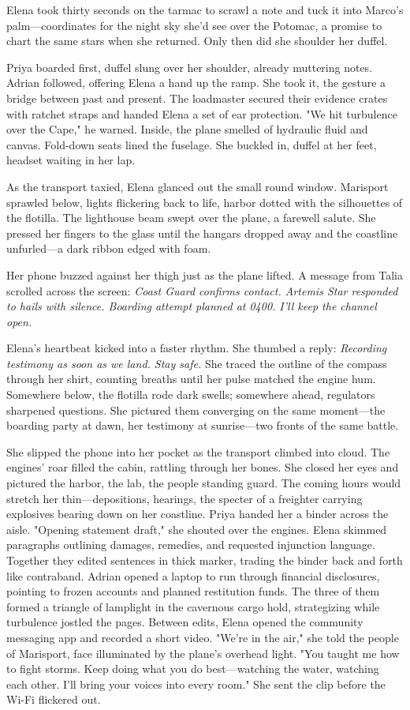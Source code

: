 Elena took thirty seconds on the tarmac to scrawl a note and tuck it into Marco's palm—coordinates for the night sky she'd see over the Potomac, a promise to chart the same stars when she returned. Only then did she shoulder her duffel.

Priya boarded first, duffel slung over her shoulder, already muttering notes. Adrian followed, offering Elena a hand up the ramp. She took it, the gesture a bridge between past and present. The loadmaster secured their evidence crates with ratchet straps and handed Elena a set of ear protection. "We hit turbulence over the Cape," he warned. Inside, the plane smelled of hydraulic fluid and canvas. Fold-down seats lined the fuselage. She buckled in, duffel at her feet, headset waiting in her lap.

As the transport taxied, Elena glanced out the small round window. Marisport sprawled below, lights flickering back to life, harbor dotted with the silhouettes of the flotilla. The lighthouse beam swept over the plane, a farewell salute. She pressed her fingers to the glass until the hangars dropped away and the coastline unfurled—a dark ribbon edged with foam.

Her phone buzzed against her thigh just as the plane lifted. A message from Talia scrolled across the screen: \textit{Coast Guard confirms contact. \textit{Artemis Star} responded to hails with silence. Boarding attempt planned at 0400. I'll keep the channel open.}

Elena's heartbeat kicked into a faster rhythm. She thumbed a reply: \textit{Recording testimony as soon as we land. Stay safe.} She traced the outline of the compass through her shirt, counting breaths until her pulse matched the engine hum. Somewhere below, the flotilla rode dark swells; somewhere ahead, regulators sharpened questions. She pictured them converging on the same moment—the boarding party at dawn, her testimony at sunrise—two fronts of the same battle.

She slipped the phone into her pocket as the transport climbed into cloud. The engines' roar filled the cabin, rattling through her bones. She closed her eyes and pictured the harbor, the lab, the people standing guard. The coming hours would stretch her thin—depositions, hearings, the specter of a freighter carrying explosives bearing down on her coastline. Priya handed her a binder across the aisle. "Opening statement draft," she shouted over the engines. Elena skimmed paragraphs outlining damages, remedies, and requested injunction language. Together they edited sentences in thick marker, trading the binder back and forth like contraband. Adrian opened a laptop to run through financial disclosures, pointing to frozen accounts and planned restitution funds. The three of them formed a triangle of lamplight in the cavernous cargo hold, strategizing while turbulence jostled the pages. Between edits, Elena opened the community messaging app and recorded a short video. "We're in the air," she told the people of Marisport, face illuminated by the plane's overhead light. "You taught me how to fight storms. Keep doing what you do best—watching the water, watching each other. I'll bring your voices into every room." She sent the clip before the Wi-Fi flickered out.

